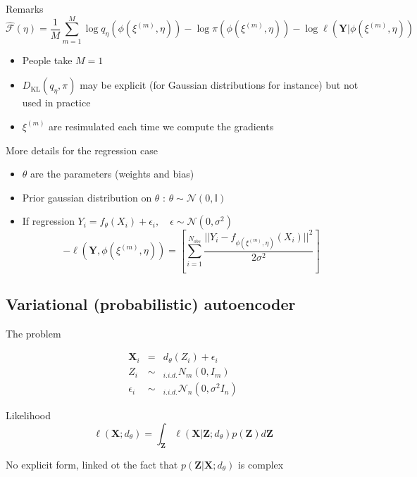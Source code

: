 \documentclass[compress,10pt]{beamer}
\def\bY{\boldsymbol{Y}}
\begin{document}
\begin{frame}{Remarks}
$$\widehat{\mathcal{F}}(\eta) = \frac{1}{M}\sum_{m=1}^M   \log q_{\eta}(\phi(\xi^{(m)},\eta)) - \log \pi(\phi(\xi^{(m)},\eta)) - \log \ell(\mathbf{Y}| \phi(\xi^{(m)},\eta))$$

 \begin{itemize}
 \item  People take $M=1$  
  \item  $D_{\text{KL}}(q_{\eta},\pi)$ may be explicit (for Gaussian distributions for instance) but not used in practice
  \item  $\xi^{(m)}$ are resimulated each time we compute the gradients
  \end{itemize}
\end{frame}
  
\begin{frame}{More details for the regression case}

\begin{itemize}
 \item $\theta$ are the parameters (weights and bias)
 \item Prior gaussian distribution on $\theta$ : $\theta \sim \mathcal{N}(0, \mathbb{I})$
 \item If regression  $Y_i = f_\theta(X_i) + \epsilon_i, \quad \epsilon \sim \mathcal{N}(0,\sigma^2)$ 
 $$-\ell(\bY,\phi(\xi^{(m)},\eta)) = \left[\sum_{i=1}^{N_{obs}}   \frac{||Y_i - f_{ \phi(\xi^{(m)},\eta) }(X_i)||^2}{2\sigma^2}\right]$$ 
 
\end{itemize}



\end{frame}

\subsection{Variational (probabilistic)
autoencoder}


\begin{frame}{The problem}

\begin{eqnarray*}
 \mathbf{X}_i &=&d_\theta(Z_i) + \epsilon_i \\
 Z_i &\sim&_{i.i.d.}N_m(0,I_m)\\
 \epsilon_i &\sim&_{i.i.d.} \mathcal{N}_n(0,\sigma^2 I_n)
\end{eqnarray*}

Likelihood
  \[\ell(\mathbf{X}; d_{\theta})  =  \int_{\mathbf{Z}} \ell(\mathbf{X} | \mathbf{Z};d_\theta)p(\mathbf{Z})d\mathbf{Z}\]

No explicit form, linked ot the fact that $p(\mathbf{Z}  | \mathbf{X};d_{\theta})$ is complex
  
\end{frame}
\end{document}
